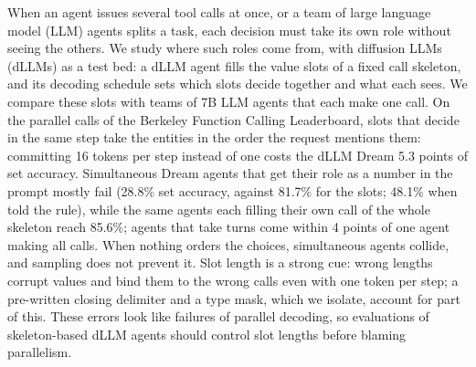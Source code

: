When an agent issues several tool calls at once, or a team of large language model (LLM) agents splits a task, each decision must take its own role without seeing the others. We study where such roles come from, with diffusion LLMs (dLLMs) as a test bed: a dLLM agent fills the value slots of a fixed call skeleton, and its decoding schedule sets which slots decide together and what each sees. We compare these slots with teams of 7B LLM agents that each make one call. On the parallel calls of the Berkeley Function Calling Leaderboard, slots that decide in the same step take the entities in the order the request mentions them: committing 16 tokens per step instead of one costs the dLLM Dream 5.3 points of set accuracy. Simultaneous Dream agents that get their role as a number in the prompt mostly fail (28.8\% set accuracy, against 81.7\% for the slots; 48.1\% when told the rule), while the same agents each filling their own call of the whole skeleton reach 85.6\%; agents that take turns come within 4 points of one agent making all calls. When nothing orders the choices, simultaneous agents collide, and sampling does not prevent it. Slot length is a strong cue: wrong lengths corrupt values and bind them to the wrong calls even with one token per step; a pre-written closing delimiter and a type mask, which we isolate, account for part of this. These errors look like failures of parallel decoding, so evaluations of skeleton-based dLLM agents should control slot lengths before blaming parallelism.
